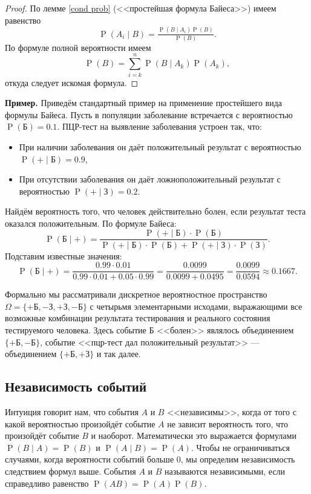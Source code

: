 \documentclass[12pt]{article}
\numberwithin{theorem}{section}
\theoremstyle{definition}
\newenvironment{example}{\indent \textbf{Пример.}}{\indent}
\newcommand{\defin}[2]{\hypertarget{#2}{{\color{red} #1}}}
\newcommand{\prob}{\operatorname{P}}
\begin{document}
	\begin{proof}
		По лемме \ref{cond prob} (<<простейшая формула Байеса>>) имеем равенство
		$$ \prob(A_i \mid B) = \tfrac{\prob(B \mid A_i)\prob(B)}{\prob(B)}. $$
		По формуле полной вероятности имеем
		$$ \prob(B) = \sum\limits_{i = k}^{n} \prob(B \mid A_k)\prob(A_k), $$
		откуда следует искомая формула.
	\end{proof}
	
	\begin{example}
		Приведём стандартный пример на применение простейшего вида формулы Байеса.
		Пусть в популяции заболевание встречается с вероятностью \( \prob(\text{Б}) = 0.1 \).  
		ПЦР-тест на выявление заболевания устроен так, что:
		\begin{itemize}
			\item При наличии заболевания он даёт положительный результат с вероятностью \( \prob(+ \mid \text{Б}) = 0.9 \),
			\item При отсутствии заболевания он даёт ложноположительный результат с вероятностью 
			\( \prob(+ \mid \text{З}) = 0.2 \).
		\end{itemize}
		Найдём вероятность того, что человек действительно болен, если результат теста оказался положительным.
		По формуле Байеса:
		$$ \prob(\text{Б} \mid +) 
		= \frac{\prob(+ \mid \text{Б})\cdot \prob(\text{Б})}
		{\prob(+ \mid \text{Б})\cdot \prob(\text{Б}) + \prob(+ \mid \text{З})\cdot \prob(\text{З})}.
		$$
		Подставим известные значения:
		$$
		 \prob(\text{Б} \mid +) = \frac{0.99 \cdot 0.01}
		 {0.99 \cdot 0.01 + 0.05 \cdot 0.99} = \frac{0.0099}{0.0099 + 0.0495} = \frac{0.0099}{0.0594} \approx 0.1667.
		$$
		
		Формально мы рассматривали дискретное вероятностное пространство 
		$ \Omega = \{+\text{Б},-\text{З},+\text{З},-\text{Б}\} $ с четырьмя элементарными исходами,
		выражающими все возможные комбинации результата тестирования и реального состояния тестируемого человека.
		Здесь событие Б <<болен>> являлось объединением $ \{+\text{Б},-\text{Б} \} $,
		событие <<пцр-тест дал положительный результат>> --- объединением $ \{+\text{Б},+\text{З} \} $
		и так далее.
		\end{example}
	
	\subsection{Независимость событий}
	
	Интуиция говорит нам, что события $ A $ и $ B $ <<независимы>>, когда от того с какой вероятностью произойдёт событие $ A $
	не зависит вероятность того, что произойдёт событие $ B $ и наоборот.
	Математически это выражается формулами $ \prob(B \mid A) = \prob(B) $ и $ \prob(A \mid B) = \prob(A) $.
	Чтобы не ограничиваться случаями, когда вероятности событий больше 0, мы определим независимость
	следствием формул выше. События $ A $ и $ B $ называются \defin{независимыми}{independent}, если справедливо равенство
	$ \prob(AB) = \prob(A)\prob(B) $.
	
\end{document}
